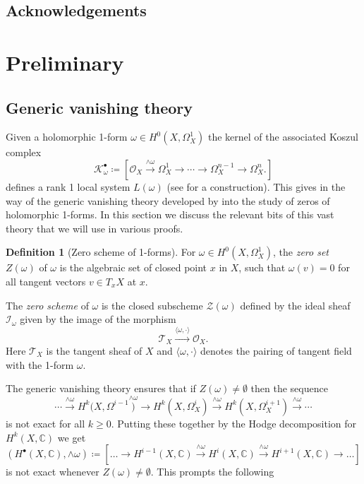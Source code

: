 \documentclass[11pt,reqno]{amsart}
\theoremstyle{definition}
\newtheorem{definition}[theorem]{Definition}
\theoremstyle{remark}
\theoremstyle{cited}
\theoremstyle{citeddef}
\newcommand{\C}{\mathbb{C}}
\newcommand{\sK}{\mathcal{K}}
\newcommand{\sO}{\mathcal{O}}
\newcommand{\sZ}{\mathcal{Z}}
\newcommand{\bbC}{\mathbb{C}}
\begin{document}
\subsection*{Acknowledgements}



\section{Preliminary}
\subsection{Generic vanishing theory}
Given a holomorphic 1-form $\omega\in H^0(X,\Omega_X^1)$
the kernel of the associated Koszul complex
\begin{equation}
\sK^{\bullet}_{\omega} \coloneqq [\sO_X\overset{\wedge\omega}{\to} \Omega_X^1 \to \cdots\to \Omega_X^{n-1}\to \Omega^n_X.]
\label{eq:koszul}
\end{equation}
defines a rank 1 local system $L(\omega)$ (see \cite[\S 2.1]{sch}
for a construction). This gives in the way of the generic vanishing theory developed by \cite{GL, Ara, Sim} into the 
study of zeros of holomorphic 1-forms. In this section we discuss 
the relevant bits of this vast theory that we will use in various
proofs.

\begin{definition}[Zero scheme of 1-forms]\label{def:zeroscheme}
For $\omega\in H^0(X, \Omega_X^1)$, the \emph{zero set} $Z(\omega)$ of $\omega$ is the algebraic set of closed point $x$ in $X$, such that $\omega(v)=0$
for all tangent vectors $v\in T_xX$ at $x$. 

The \emph{zero scheme} of $\omega$ is the closed subscheme $\sZ(\omega)$ defined by the ideal sheaf $\mathcal{I}_{\omega}$ given by the image of the morphism 
\[\mathcal{T}_X\overset{\langle\omega, \cdot\rangle}{\longrightarrow} \mathcal{O}_X.\] 
Here $\mathcal{T}_X$ is the tangent sheaf of $X$ and $\langle\omega, \cdot\rangle$ denotes the pairing of tangent field with 
the 1-form $\omega$.
\end{definition}

 
The generic vanishing theory 
\cite[Proposition 3.4]{GL} ensures that
if $Z(\omega)\neq \emptyset$ then the sequence
\[\cdots\overset{\wedge\omega}{\to} H^k(X, \Omega^{i-1}
\overset{\wedge\omega}){\to}H^k(X, \Omega_X^{i})
\overset{\wedge\omega}{\to} H^k(X,\Omega_X^{i+1})
\overset{\wedge\omega}{\to}\cdots\]
is not exact for all $k\geq 0$. Putting these together 
by the Hodge decomposition for $H^k(X,\bbC)$ we get
\begin{equation}
(H^{\bullet}(X,\bbC), \wedge\omega)\coloneqq [\ldots\to H^{i-1}(X,\C)\overset{\wedge\omega}{\longrightarrow}H^{i}(X,\C)\overset{\wedge\omega}{\longrightarrow}H^{i+1}(X,\C)\to\ldots]
\label{eq:resonance}
\end{equation}
is not exact whenever $Z(\omega)\neq \emptyset$. This prompts the following
\end{document}
